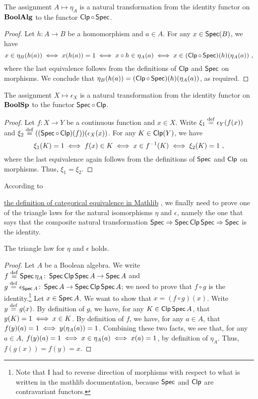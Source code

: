 \documentclass[a4paper,10pt]{article}
\numberwithin{theorem}{section}
\newcommand{\docref}[3]{
    \href{
        https://leanprover-community.github.io/mathlib4_docs/Mathlib/#1.html\##2
    }{#3}
}
\begin{document}
\begin{proposition}\label{etanat}
    The assignment $A \mapsto \eta_A$ is a natural transformation from the
    identity functor on $\mathbf{BoolAlg}$ to the functor $\operatorname*{\mathsf{Clp}} \circ \operatorname*{\mathsf{Spec}}$.
\end{proposition}
\begin{proof}
    Let $h \colon A \to B$ be a homomorphism and $a \in A$. For any $x \in
    \operatorname*{\mathsf{Spec}}(B)$, we have
    \[ x \in \eta_B(h(a)) \iff x(h(a)) = 1 \iff x \circ h \in \eta_A(a) \iff
    x \in (\operatorname*{\mathsf{Clp}} \circ \operatorname*{\mathsf{Spec}})(h)(\eta_A(a)) \ , \]
    where the last equivalence follows from the definitions of $\operatorname*{\mathsf{Clp}}$ and
    $\operatorname*{\mathsf{Spec}}$ on morphisms. We conclude that $\eta_B(h(a)) = (\operatorname*{\mathsf{Clp}} \circ
    \operatorname*{\mathsf{Spec}})(h)(\eta_A(a))$, as required.
\end{proof}

\begin{proposition}\label{epsilonnat}
    The assignment $X \mapsto \epsilon_X$ is a natural transformation from the
    identity functor on $\mathbf{BoolSp}$ to the functor $\operatorname*{\mathsf{Spec}} \circ \operatorname*{\mathsf{Clp}}$.
\end{proposition}
\begin{proof}
    Let $f \colon X \to Y$ be a continuous function and $x \in X$. Write $\xi_1
    \stackrel{\mathrm{def}}{=} \epsilon_Y(f(x))$ and $\xi_2 \stackrel{\mathrm{def}}{=} ((\operatorname*{\mathsf{Spec}} \circ
    \operatorname*{\mathsf{Clp}})(f))(\epsilon_X(x))$. For any $K \in \operatorname*{\mathsf{Clp}}(Y)$, we have
    \[ \xi_1(K) = 1 \iff f(x) \in K \iff x \in f^{-1}(K) \iff
    \xi_2(K) = 1 \ , \]
    where the last equivalence again follows from the definitions of $\operatorname*{\mathsf{Spec}}$
    and $\operatorname*{\mathsf{Clp}}$ on morphisms. Thus, $\xi_1 = \xi_2$.
\end{proof}

According to
\docref{CategoryTheory/Equivalence}{CategoryTheory.Equivalence}{the
definition of categorical equivalence in Mathlib}, we finally need to prove one
of the triangle laws for the natural isomorphisms $\eta$ and $\epsilon$, namely
the one that says that the composite natural transformation $\operatorname*{\mathsf{Spec}} \Rightarrow
\operatorname*{\mathsf{Spec}} \operatorname*{\mathsf{Clp}} \operatorname*{\mathsf{Spec}} \Rightarrow \operatorname*{\mathsf{Spec}}$ is the identity.
\begin{proposition}\label{triangle}
    The triangle law for $\eta$ and $\epsilon$ holds. 
\end{proposition}
\begin{proof}
    Let $A$ be a Boolean algebra. We write $f \stackrel{\mathrm{def}}{=} \operatorname*{\mathsf{Spec}} \eta_A \colon \operatorname*{\mathsf{Spec}}
    \operatorname*{\mathsf{Clp}} \operatorname*{\mathsf{Spec}} A \to \operatorname*{\mathsf{Spec}} A$ and $g \stackrel{\mathrm{def}}{=} \epsilon_{\operatorname*{\mathsf{Spec}} A} \colon \operatorname*{\mathsf{Spec}} A
    \to \operatorname*{\mathsf{Spec}} \operatorname*{\mathsf{Clp}} \operatorname*{\mathsf{Spec}} A$; we need to prove that $f \circ g$ is the
    identity.\footnote{
        Note that I had to reverse direction of morphisms with respect to what
        is written in the mathlib documentation, because $\operatorname*{\mathsf{Spec}}$ and $\operatorname*{\mathsf{Clp}}$ are
        contravariant functors.}
    Let $x \in \operatorname*{\mathsf{Spec}} A$. We want to show that $x = (f \circ g)(x)$.  Write $y
    \stackrel{\mathrm{def}}{=} g(x)$. By definition of $g$, we have, for any $K \in \operatorname*{\mathsf{Clp}} \operatorname*{\mathsf{Spec}} A$,
    that $y(K) = 1 \iff x \in K$. By definition of $f$, we have, for any $a
    \in A$, that $f(y)(a) = 1 \iff y(\eta_A(a)) = 1$. Combining these two
    facts, we see that, for any $a \in A$, $f(y)(a) = 1 \iff x \in \eta_A(a)
    \iff x(a) = 1$, by definition of $\eta_A$. Thus, $f(g(x)) = f(y) = x$.
\end{proof}
\end{document}
